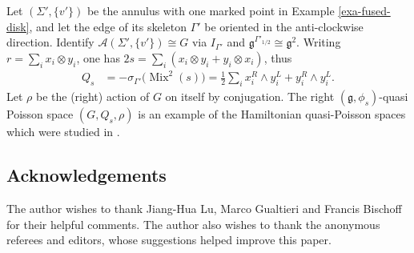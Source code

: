 \documentclass[10pt,a4paper]{amsart}
\numberwithin{equation}{section}
\def \g {\mathfrak{a}}
\def \g {\mathfrak{g}}
\def \A {{\mathcal{A}}}
\DeclareMathOperator{\Mix}{Mix}
\def \sGam {{\scriptscriptstyle \Gamma}}
\begin{document}
\begin{Example}Let $(\Sigma', \{v'\})$ be the annulus with one marked point in Example \ref{exa-fused-disk}, and let the edge of its skeleton $\Gamma'$ be oriented in the anti-clockwise direction. Identify $\A(\Sigma', \{v'\}) \cong G$ via $I_{\Gamma'}$ and $\g^{\Gamma'_{1/2}} \cong \g^2$. Writing $r = \sum_i x_i \otimes y_i$, one has $2s = \sum_i (x_i \otimes y_i + y_i \otimes x_i)$, thus
\begin{align*}
Q_s & =- \sigma_{\sGam'}\big(\Mix^2(s)\big) = \frac{1}{2} \sum_i x_i^R \wedge y_i^L + y_i^R \wedge y_i^L.
\end{align*}
Let $\rho$ be the (right) action of $G$ on itself by conjugation. The right $(\g, \phi_s)$-quasi Poisson space $(G, Q_s, \rho)$ is an example of the Hamiltonian quasi-Poisson spaces which were studied in \cite{AA}.
\end{Example}

\subsection*{Acknowledgements}

The author wishes to thank Jiang-Hua Lu, Marco Gualtieri and Francis Bischof\/f for their helpful comments. The author also wishes to thank the anonymous referees and editors, whose suggestions helped improve this paper.

\end{document}
